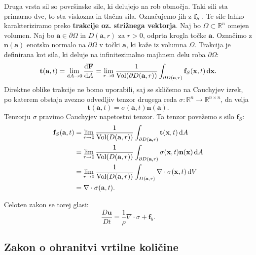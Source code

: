 \documentclass[mat2, tisk]{fmfdelo}
\newcommand{\R}{\mathbb R}
\newcommand{\bd}{\textbf}
\begin{document}
Druga vrsta sil so površinske sile, ki delujejo na rob območja. 
Taki sili sta primarno dve, to sta viskozna in tlačna sila.
Označujemo jih z $\bd{f}_S$ .
Te sile lahko karakteriziramo preko \bd{trakcije oz. strižnega vektorja}.
Naj bo $\Omega \subset \R^n$ omejen volumen. Naj bo $\bd{a}\in \partial \Omega$ in 
$D(\bd{a}, r)$ za $r>0$, odprta krogla točke $\bd{a}$. Označimo z $\bd{n}(\bd{a})$ enotsko normalo na $\partial \Omega$ v točki $\bd{a}$, ki kaže iz volumna $\Omega$.
Trakcija je definirana kot sila, ki deluje na infinitezimalno majhnem delu roba $\partial \Omega$:
\begin{equation*}
\bd{t}(\bd{a}, t) = \lim_{\dif A \rightarrow 0} \frac{\dif \bd{F}}{\dif A} = \lim_{r \rightarrow 0} \frac{1}{\text{Vol}(\partial D(\bd{a}, r))} \int_{\partial D(\bd{a}, r)} \bd{f}_S(\bd{x}, t) \dif \bd{x}.
\end{equation*}
Direktne oblike trakcije ne bomo uporabili, saj se skličemo na 
Cauchyjev izrek, po katerem obstaja zvezno odvedljiv tenzor drugega reda 
$\sigma: \R^n \rightarrow \R^{n\times n}$, 
da velja 
$$
\bd{t}(\bd{a}, t) = \sigma(\bd{a}, t)\bd{n}(\bd{a}).
$$
Tenzorju $\sigma$ pravimo Cauchyjev napetostni tenzor. 
Ta tenzor povežemo s silo $\bd{f}_S$: 
\begin{align*}
\bd{f}_S(\bd{a}, t) &= \lim_{r \rightarrow 0} \frac{1}{\text{Vol}(D(\bd{a}, r))} \int_{\partial D(\bd{a}, r)} \bd{t}(\bd{x}, t) \dif A \\
&= \lim_{r \rightarrow 0} \frac{1}{\text{Vol}(D(\bd{a}, r))} \int_{\partial D(\bd{a}, r)} \sigma(\bd{x}, t) \bd{n}(\bd{x}) \dif A \\
&= \lim_{r \rightarrow 0} \frac{1}{\text{Vol}(D(\bd{a}, r))} \int_{D(\bd{a}, r)} \nabla \cdot \sigma(\bd{x}, t) \dif V \\
&= \nabla \cdot \sigma(\bd{a}, t).
\end{align*}

Celoten zakon se torej glasi:
\begin{equation*}
\frac{D \bd{u}}{D t} = \frac{1}{\rho} \nabla \cdot \sigma + \bd{f}_b.
\end{equation*}

\subsection{Zakon o ohranitvi vrtilne količine}
\end{document}
